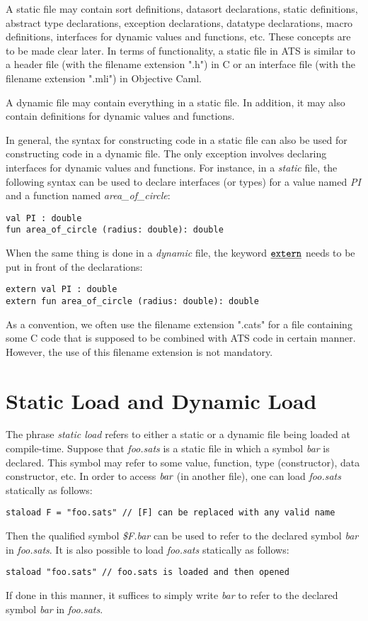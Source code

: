 A static file may contain sort definitions, datasort declarations, static
definitions, abstract type declarations, exception declarations, datatype
declarations, macro definitions, interfaces for dynamic values and
functions, etc.  These concepts are to be made clear later.  In terms of
functionality, a static file in ATS is similar to a header file (with the
filename extension ".h") in C or an interface file (with the filename
extension ".mli") in Objective Caml.

A dynamic file may contain everything in a static file. In addition, it may
also contain definitions for dynamic values and functions.

In general, the syntax for constructing code in a static file can also be
used for constructing code in a dynamic file. The only exception involves
declaring interfaces for dynamic values and functions. For instance, in a
{\it static} file, the following syntax can be used to declare interfaces
(or types) for a value named {\it PI} and a function named
{\it area\_of\_circle}:
\begin{verbatim}
val PI : double
fun area_of_circle (radius: double): double
\end{verbatim}
When the same thing is done in a {\it dynamic} file, the keyword
$\underline{\texttt{extern}}$ needs to be put in front of the declarations:
\begin{verbatim}
extern val PI : double
extern fun area_of_circle (radius: double): double
\end{verbatim}

As a convention, we often use the filename extension ".cats" for a file
containing some C code that is supposed to be combined with ATS code in
certain manner. However, the use of this filename extension is not
mandatory.


\section{Static Load and Dynamic Load}
The phrase {\em static load} refers to either a static or a dynamic file
being loaded at compile-time. Suppose that {\it foo.sats} is a static file
in which a symbol {\it bar} is declared. This symbol may refer to some
value, function, type (constructor), data constructor, etc.  In order to
access $\mbox{\it bar}$ (in another file), one can load {\it foo.sats}
statically as follows:
\begin{verbatim}
staload F = "foo.sats" // [F] can be replaced with any valid name
\end{verbatim}
Then the qualified symbol {\it \$F.bar} can be used to refer to the
declared symbol {\it bar} in {\it foo.sats}. It is also possible
to load {\it foo.sats} statically as follows:
\begin{verbatim}
staload "foo.sats" // foo.sats is loaded and then opened
\end{verbatim}
If done in this manner, it suffices to simply write {\it bar} to refer to
the declared symbol {\it bar} in {\it foo.sats}.

